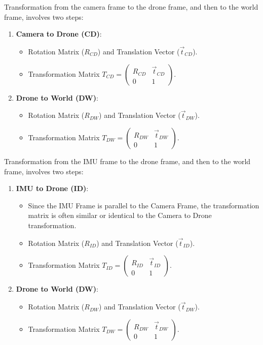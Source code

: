 Transformation from the camera frame to the drone frame, and then to the world frame, involves two steps:

\begin{enumerate}
    \item \textbf{Camera to Drone (CD)}: 
    \begin{itemize}
        \item Rotation Matrix (\( R_{CD} \)) and Translation Vector (\( \vec{t}_{CD} \)).
        \item Transformation Matrix \( T_{CD} = \begin{pmatrix} R_{CD} & \vec{t}_{CD} \\ 0 & 1 \end{pmatrix} \).
    \end{itemize}

    \item \textbf{Drone to World (DW)}:
    \begin{itemize}
        \item Rotation Matrix (\( R_{DW} \)) and Translation Vector (\( \vec{t}_{DW} \)).
        \item Transformation Matrix \( T_{DW} = \begin{pmatrix} R_{DW} & \vec{t}_{DW} \\ 0 & 1 \end{pmatrix} \).
    \end{itemize}
\end{enumerate}

Transformation from the IMU frame to the drone frame, and then to the world frame, involves two steps:

\begin{enumerate}
    \item \textbf{IMU to Drone (ID)}: 
    \begin{itemize}
        \item Since the IMU Frame is parallel to the Camera Frame, the transformation matrix is often similar or identical to the Camera to Drone transformation.
        \item Rotation Matrix (\( R_{ID} \)) and Translation Vector (\( \vec{t}_{ID} \)).
        \item Transformation Matrix \( T_{ID} = \begin{pmatrix} R_{ID} & \vec{t}_{ID} \\ 0 & 1 \end{pmatrix} \).
    \end{itemize}

    \item \textbf{Drone to World (DW)}:
    \begin{itemize}
        \item Rotation Matrix (\( R_{DW} \)) and Translation Vector (\( \vec{t}_{DW} \)).
        \item Transformation Matrix \( T_{DW} = \begin{pmatrix} R_{DW} & \vec{t}_{DW} \\ 0 & 1 \end{pmatrix} \).
    \end{itemize}
\end{enumerate}

